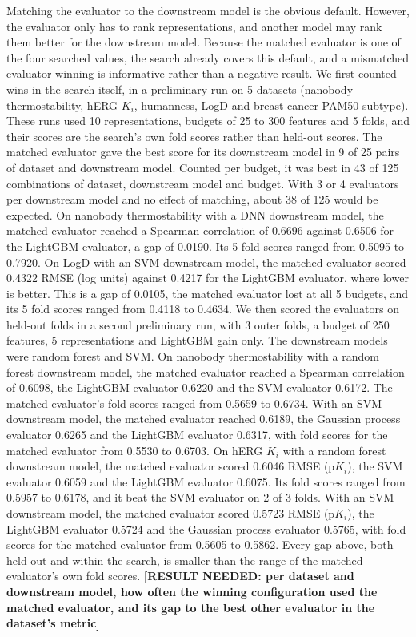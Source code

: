 Matching the evaluator to the downstream model is the obvious default. However, the evaluator only has to rank representations, and another model may rank them better for the downstream model. Because the matched evaluator is one of the four searched values, the search already covers this default, and a mismatched evaluator winning is informative rather than a negative result. We first counted wins in the search itself, in a preliminary run on 5 datasets (nanobody thermostability, hERG $K_i$, humanness, LogD and breast cancer PAM50 subtype). These runs used 10 representations, budgets of 25 to 300 features and 5 folds, and their scores are the search's own fold scores rather than held-out scores. The matched evaluator gave the best score for its downstream model in 9 of 25 pairs of dataset and downstream model. Counted per budget, it was best in 43 of 125 combinations of dataset, downstream model and budget. With 3 or 4 evaluators per downstream model and no effect of matching, about 38 of 125 would be expected. On nanobody thermostability with a DNN downstream model, the matched evaluator reached a Spearman correlation of 0.6696 against 0.6506 for the LightGBM evaluator, a gap of 0.0190. Its 5 fold scores ranged from 0.5095 to 0.7920. On LogD with an SVM downstream model, the matched evaluator scored 0.4322 RMSE (log units) against 0.4217 for the LightGBM evaluator, where lower is better. This is a gap of 0.0105, the matched evaluator lost at all 5 budgets, and its 5 fold scores ranged from 0.4118 to 0.4634. We then scored the evaluators on held-out folds in a second preliminary run, with 3 outer folds, a budget of 250 features, 5 representations and LightGBM gain only. The downstream models were random forest and SVM. On nanobody thermostability with a random forest downstream model, the matched evaluator reached a Spearman correlation of 0.6098, the LightGBM evaluator 0.6220 and the SVM evaluator 0.6172. The matched evaluator's fold scores ranged from 0.5659 to 0.6734. With an SVM downstream model, the matched evaluator reached 0.6189, the Gaussian process evaluator 0.6265 and the LightGBM evaluator 0.6317, with fold scores for the matched evaluator from 0.5530 to 0.6703. On hERG $K_i$ with a random forest downstream model, the matched evaluator scored 0.6046 RMSE (p$K_i$), the SVM evaluator 0.6059 and the LightGBM evaluator 0.6075. Its fold scores ranged from 0.5957 to 0.6178, and it beat the SVM evaluator on 2 of 3 folds. With an SVM downstream model, the matched evaluator scored 0.5723 RMSE (p$K_i$), the LightGBM evaluator 0.5724 and the Gaussian process evaluator 0.5765, with fold scores for the matched evaluator from 0.5605 to 0.5862. Every gap above, both held out and within the search, is smaller than the range of the matched evaluator's own fold scores. \textbf{[RESULT NEEDED: per dataset and downstream model, how often the winning configuration used the matched evaluator, and its gap to the best other evaluator in the dataset's metric]}

